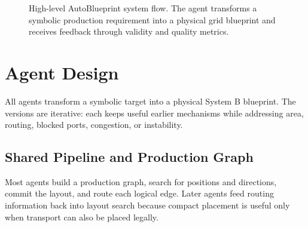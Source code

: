 \documentclass[11pt,a4paper]{article}
\begin{document}
\begin{figure}[H]
    \centering
    \caption{High-level AutoBlueprint system flow. The agent transforms a symbolic production requirement into a physical grid blueprint and receives feedback through validity and quality metrics.}
    \label{fig:architecture}
\end{figure}

\section{Agent Design}
\label{sec:agent-design}

All agents transform a symbolic target into a physical System B blueprint. The versions are iterative: each keeps useful earlier mechanisms while addressing area, routing, blocked ports, congestion, or instability.

\subsection{Shared Pipeline and Production Graph}

Most agents build a production graph, search for positions and directions, commit the layout, and route each logical edge. Later agents feed routing information back into layout search because compact placement is useful only when transport can also be placed legally.
\end{document}
